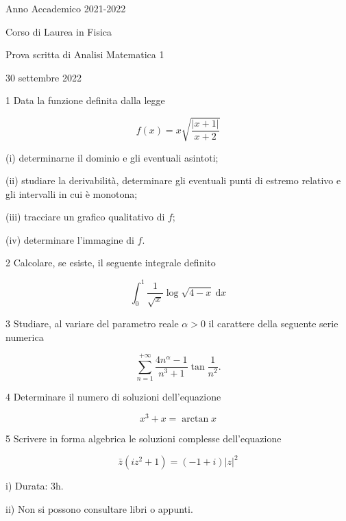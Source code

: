 \documentclass[10pt]{article}
\begin{document}
Anno Accademico 2021-2022

Corso di Laurea in Fisica

Prova scritta di Analisi Matematica 1

30 settembre 2022

1 Data la funzione definita dalla legge

\[
f(x)=x \sqrt{\frac{|x+1|}{x+2}}
\]

(i) determinarne il dominio e gli eventuali asintoti;

(ii) studiare la derivabilità, determinare gli eventuali punti di estremo relativo e gli intervalli in cui è monotona;

(iii) tracciare un grafico qualitativo di \(f\);

(iv) determinare l'immagine di \(f\).

2 Calcolare, se esiste, il seguente integrale definito

\[
\int_{0}^{1} \frac{1}{\sqrt{x}} \log \sqrt{4-x} \mathrm{~d} x
\]

3 Studiare, al variare del parametro reale \(\alpha>0\) il carattere della seguente serie numerica

\[
\sum_{n=1}^{+\infty} \frac{4 n^{\alpha}-1}{n^{3}+1} \tan \frac{1}{n^{2}} .
\]

4 Determinare il numero di soluzioni dell'equazione

\[
x^{3}+x=\arctan x
\]

5 Scrivere in forma algebrica le soluzioni complesse dell'equazione

\[
\bar{z}\left(i z^{2}+1\right)=(-1+i)|z|^{2}
\]

i) Durata: 3h.

ii) Non si possono consultare libri o appunti.
\end{document}
